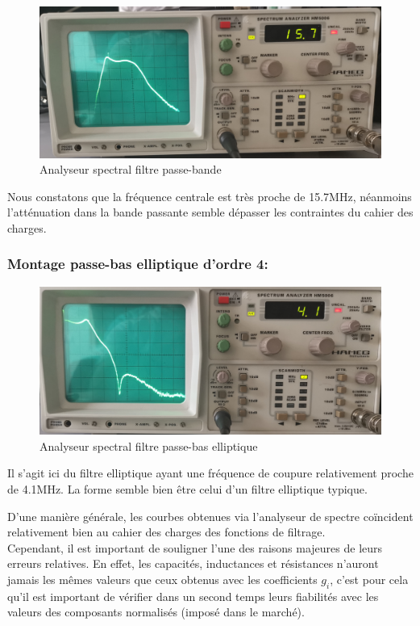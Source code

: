 \begin{figure}[!htbp]
    \includegraphics[scale=0.4,keepaspectratio]{img_spectre/analys_spec_bande.PNG}
    \centering
    \caption{Analyseur spectral filtre passe-bande}
\end{figure}
\FloatBarrier

Nous constatons que la fréquence centrale est très proche de 15.7MHz, néanmoins l'atténuation dans la bande passante semble dépasser les contraintes du cahier des charges.

\subsubsection{Montage passe-bas elliptique d'ordre 4:} 

\begin{figure}[!htbp]
    \includegraphics[scale=0.4,keepaspectratio]{img_spectre/analys_spec_elliptique.PNG}
    \centering
    \caption{Analyseur spectral filtre passe-bas elliptique}
\end{figure}
\FloatBarrier


Il s'agit ici du filtre elliptique ayant une fréquence de coupure relativement proche de 4.1MHz. La forme semble bien être celui d'un filtre elliptique typique.

\newpage
D'une manière générale, les courbes obtenues via l'analyseur de spectre coïncident relativement bien au cahier des charges des fonctions de filtrage.
\\
Cependant, il est important de souligner l'une des raisons majeures de leurs erreurs relatives.
En effet, les capacités, inductances et résistances n'auront jamais les mêmes valeurs que ceux obtenus avec les coefficients $g_i$, c'est pour cela qu'il est important de vérifier dans un second temps leurs fiabilités avec les valeurs des composants normalisés (imposé dans le marché). 

